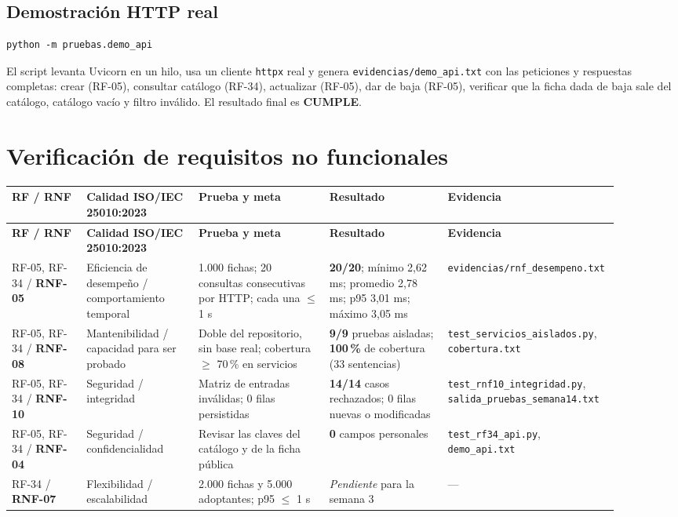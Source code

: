\documentclass[11pt,a4paper]{article}
\newcommand{\code}[1]{\texttt{#1}}
\newcommand{\thead}[1]{\textbf{#1}}
\newcommand{\pend}[1]{\textit{#1}}
\begin{document}
\subsection{Demostración HTTP real}

\begin{lstlisting}
python -m pruebas.demo_api
\end{lstlisting}

El script levanta Uvicorn en un hilo, usa un cliente \code{httpx} real y genera
\code{evidencias/demo\_api.txt} con las peticiones y respuestas completas:
crear (RF-05), consultar catálogo (RF-34), actualizar (RF-05), dar de baja
(RF-05), verificar que la ficha dada de baja sale del catálogo, catálogo vacío
y filtro inválido. El resultado final es \textbf{CUMPLE}.

\clearpage

\section{Verificación de requisitos no funcionales}

{\footnotesize
\begin{longtable}{@{}A{0.12\linewidth}L{0.18\linewidth}L{0.21\linewidth}L{0.19\linewidth}L{0.20\linewidth}@{}}
\toprule
\thead{RF / RNF} & \thead{Calidad ISO/IEC 25010:2023} & \thead{Prueba y meta} &
\thead{Resultado} & \thead{Evidencia} \\ \midrule \endfirsthead
\thead{RF / RNF} & \thead{Calidad ISO/IEC 25010:2023} & \thead{Prueba y meta} &
\thead{Resultado} & \thead{Evidencia} \\ \midrule \endhead
\bottomrule
\endlastfoot
RF-05, RF-34 / \textbf{RNF-05} & Eficiencia de desempeño / comportamiento
temporal & 1.000 fichas; 20 consultas consecutivas por HTTP; cada una $\leq$
1 s & \textbf{20/20}; mínimo 2,62 ms; promedio 2,78 ms; p95 3,01 ms; máximo
3,05 ms & \code{evidencias/rnf\_desempeno.txt} \\
RF-05, RF-34 / \textbf{RNF-08} & Mantenibilidad / capacidad para ser probado &
Doble del repositorio, sin base real; cobertura $\geq$ 70\,\% en servicios &
\textbf{9/9} pruebas aisladas; \textbf{100\,\%} de cobertura (33 sentencias) &
\code{test\_servicios\_aislados.py}, \code{cobertura.txt} \\
RF-05, RF-34 / \textbf{RNF-10} & Seguridad / integridad & Matriz de entradas
inválidas; 0 filas persistidas & \textbf{14/14} casos rechazados; 0 filas
nuevas o modificadas & \code{test\_rnf10\_integridad.py},
\code{salida\_pruebas\_semana14.txt} \\
RF-05, RF-34 / \textbf{RNF-04} & Seguridad / confidencialidad & Revisar las
claves del catálogo y de la ficha pública & \textbf{0} campos personales &
\code{test\_rf34\_api.py}, \code{demo\_api.txt} \\
RF-34 / \textbf{RNF-07} & Flexibilidad / escalabilidad & 2.000 fichas y 5.000
adoptantes; p95 $\leq$ 1 s & \pend{Pendiente} para la semana 3 & --- \\
\end{longtable}
}
\end{document}
